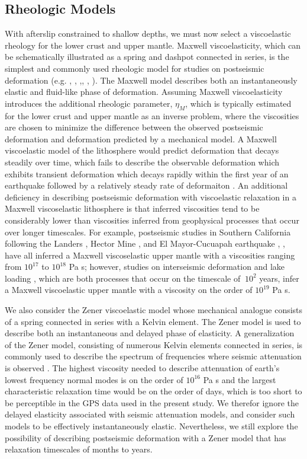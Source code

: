 \documentclass[12pt]{article}
\begin{document}
\subsection{Rheologic Models}
With afterslip constrained to shallow depths, we must now select a viscoelastic rheology for the lower crust and upper mantle. Maxwell viscoelasticity, which can be schematically illustrated as a spring and dashpot connected in series, is the simplest and commonly used rheologic model for studies on postseismic deformation (e.g. \cite{Nur1974}, \cite{Pollitz2000}, \cite{Hetland2003},\cite{Freed2006a}, \cite{Johnson2009}, \cite{Hearn2009}).  The Maxwell model describes both an instantaneously elastic and fluid-like phase of deformation.   Assuming Maxwell viscoelasticity introduces the additional rheologic parameter, $\eta_M$, which is typically estimated for the lower crust and upper mantle as an inverse problem, where the viscosities are chosen to minimize the difference between the observed postseismic deformation and deformation predicted by a mechanical model. A Maxwell viscoelastic model of the lithosphere would predict deformation that decays steadily over time, which fails to describe the observable deformation which exhibits transient deformation which decays rapidly within the first year of an earthquake followed by a relatively steady rate of deformaiton \cite{Savage1997}.  An additional deficiency in describing postseismic deformation with viscoelastic relaxation in a Maxwell viscoselastic lithosphere is that inferred viscosities tend to be considerably lower than viscosities inferred from geophysical processes that occur over longer timescales. For example, postseismic studies in Southern California following the Landers \cite{Pollitz2000}, Hector Mine \cite{Pollitz2001}, and El Mayor-Cucuapah earthquake \cite{Spinler2015}, \cite{Rollins2015}, have all inferred a Maxwell viscoselastic upper mantle with a viscosities ranging from $10^{17}$ to $10^{18}$ Pa s; however, studies on interseismic deformation \cite{Lundgren2009} and lake loading \cite{Luttrell2007}, which are both processes that occur on the timescale of $~10^2$ years, infer a Maxwell viscoelastic upper mantle with a viscosity on the order of $10^{19}$ Pa s.  

We also consider the Zener viscoelastic model whose mechanical analogue consists of a spring connected in series with a Kelvin element. The Zener model is used to describe both an instantaneous and delayed phase of elasticity.  A generalization of the Zener model, consisting of numerous Kelvin elements connected in series, is commonly used to describe the spectrum of frequencies where seismic attenuation is observed \cite{Liu1976}.  The highest viscosity needed to describe attenuation of earth's lowest frequency normal modes is on the order of $10^{16}$ Pa s \cite{Yuen1982} and the largest characteristic relaxation time would be on the order of days, which is too short to be perceptible in the GPS data used in the present study. We therefor ignore the delayed elasticity associated with seismic attenuation models, and consider such models to be effectively instantaneously elastic. Nevertheless, we still explore the possibility of describing postseismic deformation with a Zener model that has relaxation timescales of months to years.  
\end{document}
